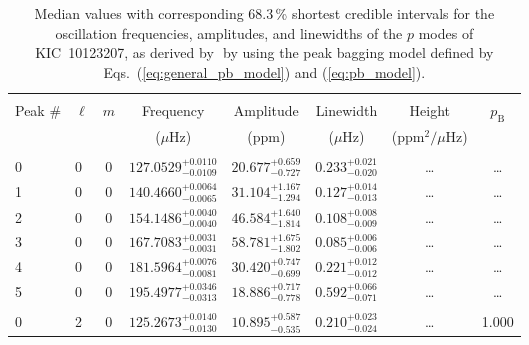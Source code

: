\begin{table*}[!]
\caption{Median values with corresponding 68.3\,\% shortest credible intervals for the oscillation frequencies, amplitudes, and linewidths of the $p$ modes of KIC~10123207, as derived by \diamonds\,\,by using the peak bagging model defined by Eqs.~(\ref{eq:general_pb_model}) and (\ref{eq:pb_model}).}
\label{tab:10123207p}
\centering
\begin{tabular}{llcrrlrc}
\hline\hline
\\[-8pt]
Peak \# & $\ell$ & $m$ & \multicolumn{1}{c}{Frequency} & \multicolumn{1}{c}{Amplitude} & \multicolumn{1}{c}{Linewidth} & \multicolumn{1}{c}{Height}& $p_\mathrm{B}$\\
 & & & \multicolumn{1}{c}{($\mu$Hz)} & \multicolumn{1}{c}{(ppm)} & \multicolumn{1}{c}{($\mu$Hz)} & \multicolumn{1}{c}{(ppm$^2/\mu$Hz)}\\
\hline \\[-8pt]
0 & 0 & 0 & $    127.0529_{-      0.0109}^{+      0.0110}$ & $      20.677_{-       0.727}^{+       0.659}$ & $       0.233_{-       0.020}^{+       0.021}$ & \multicolumn{1}{c}{\dots} & \dots \\[1pt]
1 & 0 & 0 & $    140.4660_{-      0.0065}^{+      0.0064}$ & $      31.104_{-       1.294}^{+       1.167}$ & $       0.127_{-       0.013}^{+       0.014}$ & \multicolumn{1}{c}{\dots} & \dots \\[1pt]
2 & 0 & 0 & $    154.1486_{-      0.0040}^{+      0.0040}$ & $      46.584_{-       1.814}^{+       1.640}$ & $       0.108_{-       0.009}^{+       0.008}$ & \multicolumn{1}{c}{\dots} & \dots \\[1pt]
3 & 0 & 0 & $    167.7083_{-      0.0031}^{+      0.0031}$ & $      58.781_{-       1.802}^{+       1.675}$ & $       0.085_{-       0.006}^{+       0.006}$ & \multicolumn{1}{c}{\dots} & \dots \\[1pt]
4 & 0 & 0 & $    181.5964_{-      0.0081}^{+      0.0076}$ & $      30.420_{-       0.699}^{+       0.747}$ & $       0.221_{-       0.012}^{+       0.012}$ & \multicolumn{1}{c}{\dots} & \dots \\[1pt]
5 & 0 & 0 & $    195.4977_{-      0.0313}^{+      0.0346}$ & $      18.886_{-       0.778}^{+       0.717}$ & $       0.592_{-       0.071}^{+       0.066}$ & \multicolumn{1}{c}{\dots} & \dots \\[1pt]
\hline \\[-8pt]
0 & 2 & 0 & $    125.2673_{-      0.0130}^{+      0.0140}$ & $      10.895_{-       0.535}^{+       0.587}$ & $       0.210_{-       0.024}^{+       0.023}$ & \multicolumn{1}{c}{\dots} & 1.000\\[1pt]

\end{tabular}
\end{table*}
